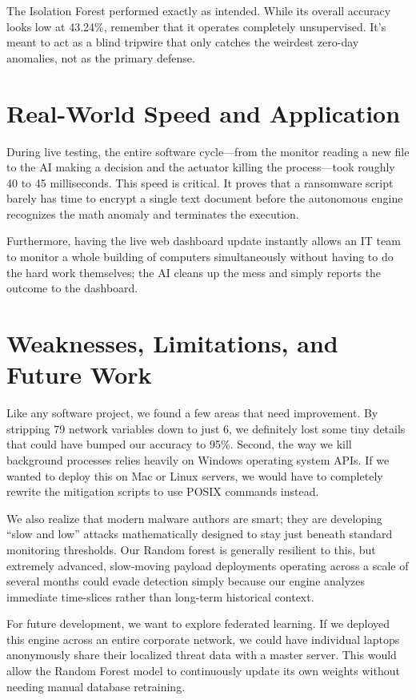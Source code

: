 \documentclass[conference]{IEEEtran}
\begin{document}
The Isolation Forest performed exactly as intended. While its overall accuracy looks low at 43.24\%, remember that it operates completely unsupervised. It's meant to act as a blind tripwire that only catches the weirdest zero-day anomalies, not as the primary defense.

\section{Real-World Speed and Application}

During live testing, the entire software cycle—from the monitor reading a new file to the AI making a decision and the actuator killing the process—took roughly 40 to 45 milliseconds. This speed is critical. It proves that a ransomware script barely has time to encrypt a single text document before the autonomous engine recognizes the math anomaly and terminates the execution. 

Furthermore, having the live web dashboard update instantly allows an IT team to monitor a whole building of computers simultaneously without having to do the hard work themselves; the AI cleans up the mess and simply reports the outcome to the dashboard.

\section{Weaknesses, Limitations, and Future Work}

Like any software project, we found a few areas that need improvement. By stripping 79 network variables down to just 6, we definitely lost some tiny details that could have bumped our accuracy to 95\%. Second, the way we kill background processes relies heavily on Windows operating system APIs. If we wanted to deploy this on Mac or Linux servers, we would have to completely rewrite the mitigation scripts to use POSIX commands instead. 

We also realize that modern malware authors are smart; they are developing ``slow and low'' attacks mathematically designed to stay just beneath standard monitoring thresholds. Our Random forest is generally resilient to this, but extremely advanced, slow-moving payload deployments operating across a scale of several months could evade detection simply because our engine analyzes immediate time-slices rather than long-term historical context.

For future development, we want to explore federated learning. If we deployed this engine across an entire corporate network, we could have individual laptops anonymously share their localized threat data with a master server. This would allow the Random Forest model to continuously update its own weights without needing manual database retraining.
\end{document}
